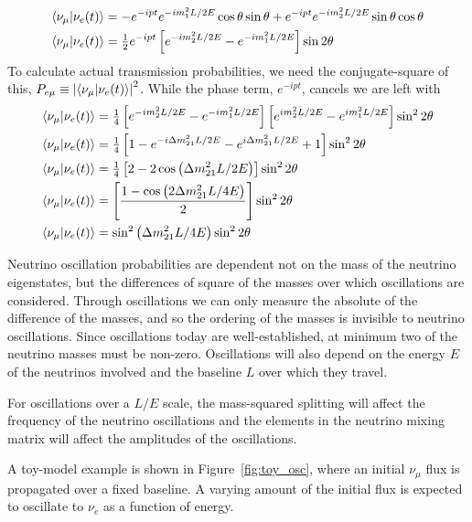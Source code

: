 \documentclass[main.tex]{subfiles}
\begin{document}
\begin{align}
    \left< \nu_{\mu} | \nu_{e}(t) \right> &= -e^{-ipt}e^{ -im_{1}^{2}L/2E} \cos\theta\sin\theta  + e^{-ipt}e^{ -im_{2}^{2}L/2E} \sin\theta\cos\theta \\
    \left< \nu_{\mu} | \nu_{e}(t) \right> &= \tfrac{1}{2}e^{-ipt}\left[e^{ -im_{2}^{2}L/2E} - e^{ -im_{1}^{2}L/2E}\right] \sin 2\theta
\end{align}
To calculate actual transmission probabilities, we need the conjugate-square of this, $P_{e\mu} \equiv \left|\left< \nu_{\mu}|\nu_{e}(t) \right>\right|^{2}$. While the phase term, $e^{-ipt}$, cancels we are left with 
\begin{align}
    \left< \nu_{\mu} | \nu_{e}(t) \right> &=\tfrac{1}{4} \left[e^{ -im_{2}^{2}L/2E} - e^{ -im_{1}^{2}L/2E}\right]\left[e^{ im_{2}^{2}L/2E} - e^{ im_{1}^{2}L/2E}\right] \sin^{2} 2\theta \\
    \left< \nu_{\mu} | \nu_{e}(t) \right> &=\tfrac{1}{4}\left[1 - e^{-i\Delta m_{21}^{2}L/2E}- e^{i\Delta m_{21}^{2}L/2E}  +1\right]\sin^{2} 2\theta\\
    \left< \nu_{\mu} | \nu_{e}(t) \right> &=\tfrac{1}{4}\left[2- 2\cos\left( \Delta m_{21}^{2}L/2E\right) \right]\sin^{2} 2\theta \\
    \left< \nu_{\mu} | \nu_{e}(t) \right> &=\left[\dfrac{1-\cos\left( 2\Delta m_{21}^{2}L/4E\right)}{2} \right]\sin^{2} 2\theta \\
    \left< \nu_{\mu} | \nu_{e}(t) \right> &=\sin^{2}\left( \Delta m_{21}^{2}L/4E\right) \sin^{2} 2\theta
\end{align}

Neutrino oscillation probabilities are dependent not on the mass of the neutrino eigenstates, but the differences of square of the masses over which oscillations are considered.
Through oscillations we can only measure the absolute of the difference of the masses, and so the ordering of the masses is invisible to neutrino oscillations. 
Since oscillations today are well-established, at minimum two of the neutrino masses must be non-zero. 
Oscillations will also depend on the energy $E$ of the neutrinos involved and the baseline $L$ over which they travel. 

For oscillations over a $L/E$ scale, the mass-squared splitting will affect the frequency of the neutrino oscillations and the elements in the neutrino mixing matrix will affect the amplitudes of the oscillations. 

A toy-model example is shown in Figure~\ref{fig:toy_osc}, where an initial $\nu_{\mu}$ flux is propagated over a fixed baseline. 
A varying amount of the initial flux is expected to oscillate to $\nu_{e}$ as a function of energy. 
\end{document}
